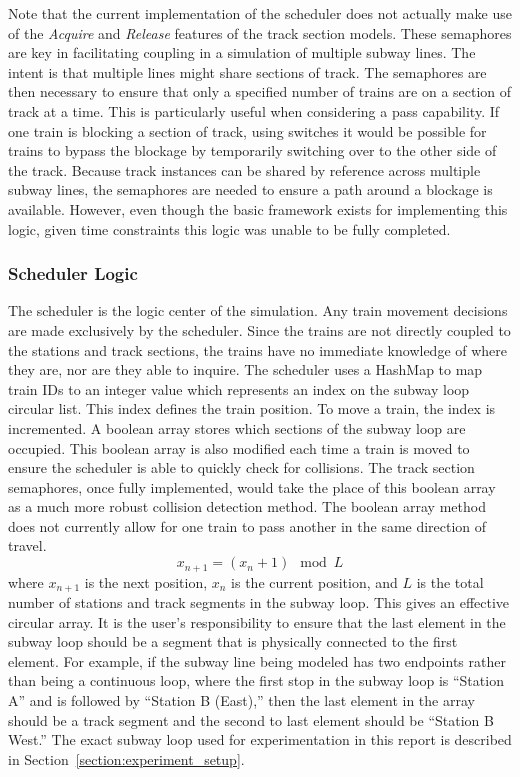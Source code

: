 Note that the current implementation of the scheduler does not actually make use of the \textit{Acquire} and \textit{Release} features of the track section models. These semaphores are key in facilitating coupling in a simulation of multiple subway lines.  The intent is that multiple lines might share sections of track.  The semaphores are then necessary to ensure that only a specified number of trains are on a section of track at a time.  This is particularly useful when considering a pass capability.  If one train is blocking a section of track, using switches it would be possible for trains to bypass the blockage by temporarily switching over to the other side of the track. Because track instances can be shared by reference across multiple subway lines, the semaphores are needed to ensure a path around a blockage is available.  However, even though the basic framework exists for implementing this logic, given time constraints this logic was unable to be fully completed.
\subsubsection{Scheduler Logic}
The scheduler is the logic center of the simulation. Any train movement decisions are made exclusively by the scheduler. Since the trains are not directly coupled to the stations and track sections, the trains have no immediate knowledge of where they are, nor are they able to inquire. The scheduler uses a HashMap to map train IDs to an integer value which represents an index on the subway loop circular list.  This index defines the train position.  To move a train, the index is incremented. A boolean array stores which sections of the subway loop are occupied. This boolean array is also modified each time a train is moved to ensure the scheduler is able to quickly check for collisions.  The track section semaphores, once fully implemented, would take the place of this boolean array as a much more robust collision detection method. The boolean array method does not currently allow for one train to pass another in the same direction of travel.
\begin{equation}
x_{n+1} = (x_n+1)\mod L
\end{equation}
where $x_{n+1}$ is the next position, $x_n$ is the current position, and $L$ is the total number of stations and track segments in the subway loop.  This gives an effective circular array. It is the user's responsibility to ensure that the last element in the subway loop should be a segment that is physically connected to the first element.  For example, if the subway line being modeled has two endpoints rather than being a continuous loop, where the first stop in the subway loop is ``Station A'' and is followed by ``Station B (East),'' then the last element in the array should be a track segment and the second to last element should be ``Station B West.''  The exact subway loop used for experimentation in this report is described in Section~\ref{section:experiment_setup}.

